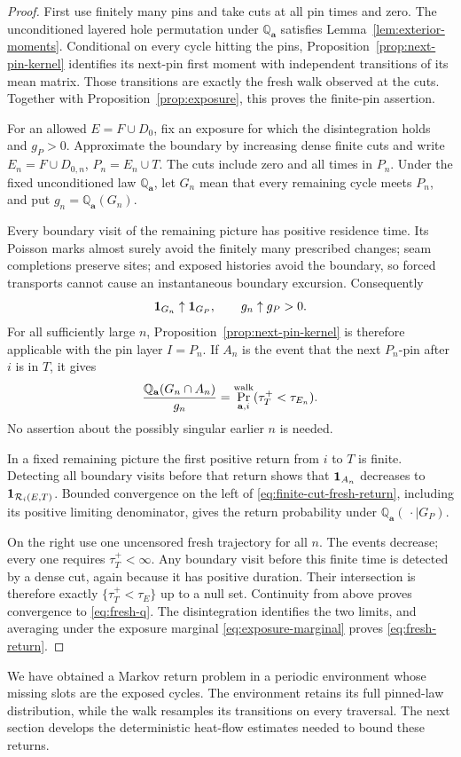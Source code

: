 \begin{proof}
First use finitely many pins and take cuts at all pin times and
zero.  The unconditioned layered hole permutation under
$\mathbb Q_{\mathbf a}$ satisfies
Lemma~\ref{lem:exterior-moments}.  Conditional on every cycle hitting
the pins, Proposition~\ref{prop:next-pin-kernel} identifies its
next-pin first moment with independent transitions of its mean matrix.
Those transitions are exactly the fresh walk observed at the cuts.
Together with Proposition~\ref{prop:exposure}, this proves the
finite-pin assertion.

For an allowed $E=F\cup D_0$, fix an exposure for which the
disintegration holds and $g_P>0$.  Approximate the boundary by
increasing dense finite cuts and write $E_n=F\cup D_{0,n}$,
$P_n=E_n\cup T$.  The cuts include zero and all times in $P_n$.
Under the fixed unconditioned law $\mathbb Q_{\mathbf a}$, let
$G_n$ mean that every remaining cycle meets $P_n$, and put
$g_n=\mathbb Q_{\mathbf a}(G_n)$.

Every boundary visit of the remaining picture has positive residence
time.  Its Poisson marks almost surely avoid the finitely many
prescribed changes; seam completions preserve sites; and exposed
histories avoid the boundary, so forced transports cannot cause an
instantaneous boundary excursion.  Consequently
\[
              \mathbf1_{G_n}\uparrow\mathbf1_{G_P},\qquad
                         g_n\uparrow g_P>0.
\]
For all sufficiently large $n$, Proposition~\ref{prop:next-pin-kernel}
is therefore applicable with the pin layer $I=P_n$.  If $A_n$ is
the event that the next $P_n$-pin after $i$ is in $T$, it gives
\begin{equation}\label{eq:finite-cut-fresh-return}
 \frac{\mathbb Q_{\mathbf a}(G_n\cap A_n)}{g_n}
       =\Pr^{\rm walk}_{\mathbf a,i}(\tau_T^+<\tau_{E_n}).
\end{equation}
No assertion about the possibly singular earlier $n$ is needed.

In a fixed remaining picture the first positive return from $i$ to
$T$ is finite.  Detecting all boundary visits before that return
shows that $\mathbf1_{A_n}$ decreases to
$\mathbf1_{\mathcal R_i(E,T)}$.  Bounded convergence on the left of
\eqref{eq:finite-cut-fresh-return}, including its positive limiting
denominator, gives the return probability under
$\mathbb Q_{\mathbf a}(\,\cdot\mid G_P)$.

On the right use one uncensored fresh trajectory for all $n$.
The events decrease; every one requires $\tau_T^+<\infty$.
Any boundary visit before this finite time is detected by a dense
cut, again because it has positive duration.  Their intersection
is therefore exactly $\{\tau_T^+<\tau_E\}$ up to a null set.
Continuity from above proves convergence to \eqref{eq:fresh-q}.
The disintegration identifies the two limits, and averaging under
the exposure marginal \eqref{eq:exposure-marginal} proves
\eqref{eq:fresh-return}.
\end{proof}

We have obtained a Markov return problem in a periodic environment
whose missing slots are the exposed cycles.  The environment retains
its full pinned-law distribution, while the walk resamples its
transitions on every traversal.  The next section develops the
deterministic heat-flow estimates needed to bound these returns.
